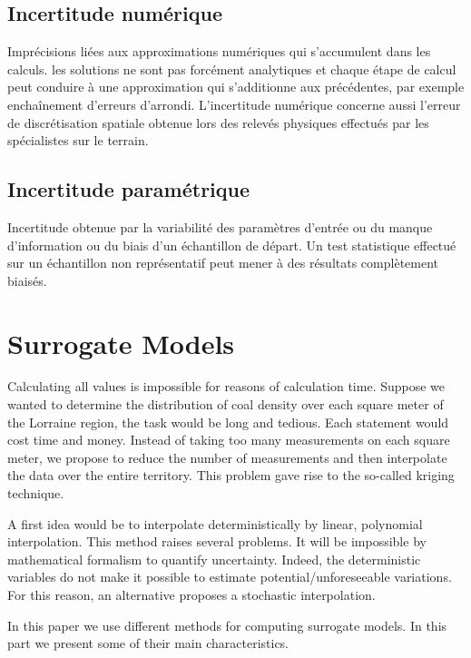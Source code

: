 \documentclass[hidelinks,12pt]{article}
\begin{document}
\subsection{Incertitude numérique}


Imprécisions liées aux approximations numériques qui s’accumulent dans les calculs. les solutions ne sont pas forcément analytiques et chaque étape de calcul peut conduire à une approximation qui s’additionne aux précédentes, par exemple enchaînement d’erreurs d’arrondi. L’incertitude numérique concerne aussi l’erreur de discrétisation spatiale obtenue lors des relevés physiques effectués par les spécialistes sur le terrain.

\subsection{Incertitude paramétrique}

Incertitude obtenue par la variabilité des paramètres d’entrée ou du manque d’information ou du biais d’un échantillon de départ. Un test statistique effectué sur un échantillon non représentatif peut mener à des résultats complètement biaisés.




\section{Surrogate Models}

Calculating all values is impossible for reasons of calculation time. Suppose we wanted to determine the distribution of coal density over each square meter of the Lorraine region, the task would be long and tedious. Each statement would cost time and money. Instead of taking too many measurements on each square meter, we propose to reduce the number of measurements and then interpolate the data over the entire territory. This problem gave rise to the so-called kriging technique.

A first idea would be to interpolate deterministically by linear, polynomial interpolation. This method raises several problems. It will be impossible by mathematical formalism to quantify uncertainty. Indeed, the deterministic variables do not make it possible to estimate potential/unforeseeable variations. For this reason, an alternative proposes a stochastic interpolation.

In this paper we use different methods for computing surrogate models. In this part we present some of their main characteristics.
\end{document}
